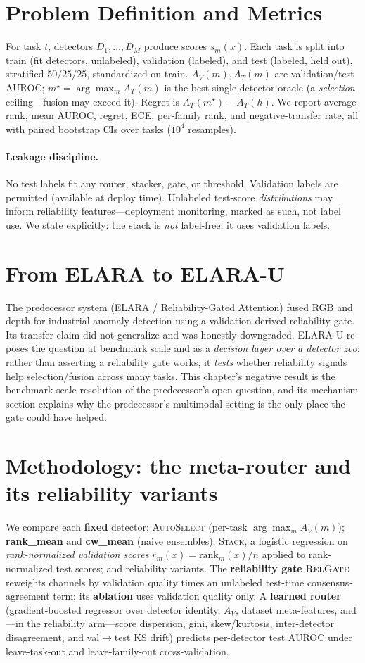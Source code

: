 \documentclass[11pt]{article}
\newcommand{\systemu}{ELARA-U}
\newcommand{\stack}{\textsc{Stack}}
\newcommand{\auto}{\textsc{AutoSelect}}
\newcommand{\relg}{\textsc{RelGate}}
\begin{document}
\section{Problem Definition and Metrics}
For task $t$, detectors $D_1,\dots,D_M$ produce scores $s_m(x)$. Each task is split
into train (fit detectors, unlabeled), validation (labeled), and test (labeled,
held out), stratified $50/25/25$, standardized on train. $A_V(m),A_T(m)$ are
validation/test AUROC; $m^\star=\arg\max_m A_T(m)$ is the best-single-detector oracle
(a \emph{selection} ceiling---fusion may exceed it). Regret is $A_T(m^\star)-A_T(h)$.
We report average rank, mean AUROC, regret, ECE, per-family rank, and negative-transfer
rate, all with paired bootstrap CIs over tasks ($10^4$ resamples).

\paragraph{Leakage discipline.} No test labels fit any router, stacker, gate, or
threshold. Validation labels are permitted (available at deploy time). Unlabeled
test-score \emph{distributions} may inform reliability features---deployment
monitoring, marked as such, not label use. We state explicitly: the stack is
\emph{not} label-free; it uses validation labels.

\section{From ELARA to \systemu{}}
The predecessor system (ELARA / Reliability-Gated Attention) fused RGB and depth for
industrial anomaly detection using a validation-derived reliability gate. Its
transfer claim did not generalize and was honestly downgraded. \systemu{} re-poses the
question at benchmark scale and as a \emph{decision layer over a detector zoo}: rather
than asserting a reliability gate works, it \emph{tests} whether reliability signals
help selection/fusion across many tasks. This chapter's negative result is the
benchmark-scale resolution of the predecessor's open question, and its mechanism
section explains why the predecessor's multimodal setting is the only place the gate
could have helped.

\section{Methodology: the meta-router and its reliability variants}
We compare each \textbf{fixed} detector; \auto{} (per-task $\arg\max_m A_V(m)$);
\textbf{rank\_mean} and \textbf{cw\_mean} (naive ensembles); \stack{}, a logistic
regression on \emph{rank-normalized validation scores} $r_m(x)=\mathrm{rank}_m(x)/n$
applied to rank-normalized test scores; and reliability variants. The \textbf{reliability
gate} $\relg{}$ reweights channels by validation quality times an unlabeled test-time
consensus-agreement term; its \textbf{ablation} uses validation quality only. A
\textbf{learned router} (gradient-boosted regressor over detector identity, $A_V$,
dataset meta-features, and---in the reliability arm---score dispersion, gini,
skew/kurtosis, inter-detector disagreement, and val$\to$test KS drift) predicts
per-detector test AUROC under leave-task-out and leave-family-out cross-validation.
\end{document}
